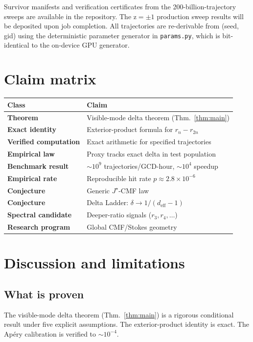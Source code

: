 \documentclass[11pt]{article}
\begin{document}
Survivor manifests and verification certificates from the 200-billion-trajectory sweeps are available in the repository. The z$=\pm 1$ production sweep results will be deposited upon job completion. All trajectories are re-derivable from (seed, gid) using the deterministic parameter generator in \texttt{params.py}, which is bit-identical to the on-device GPU generator.

\section{Claim matrix}

\begin{center}
\begin{tabular}{ll}
\toprule
Class & Claim \\
\midrule
\textbf{Theorem} & Visible-mode delta theorem (Thm.~\ref{thm:main}) \\
\textbf{Exact identity} & Exterior-product formula for $r_n - r_{2n}$ \\
\textbf{Verified computation} & Exact arithmetic for specified trajectories \\
\textbf{Empirical law} & Proxy tracks exact delta in test population \\
\textbf{Benchmark result} & $\sim 10^9$ trajectories/GCD-hour, $\sim 10^4$ speedup \\
\textbf{Empirical rate} & Reproducible hit rate $p \approx 2.8 \times 10^{-6}$ \\
\textbf{Conjecture} & Generic $J^\star$-CMF law \\
\textbf{Conjecture} & Delta Ladder: $\delta \to 1/(d_{\mathrm{eff}}-1)$ \\
\textbf{Spectral candidate} & Deeper-ratio signals ($r_3, r_4, \ldots$) \\
\textbf{Research program} & Global CMF/Stokes geometry \\
\bottomrule
\end{tabular}
\end{center}

\section{Discussion and limitations}

\subsection{What is proven}
The visible-mode delta theorem (Thm.~\ref{thm:main}) is a rigorous conditional result under five explicit assumptions. The exterior-product identity is exact. The Ap\'ery calibration is verified to $\sim 10^{-4}$.
\end{document}
